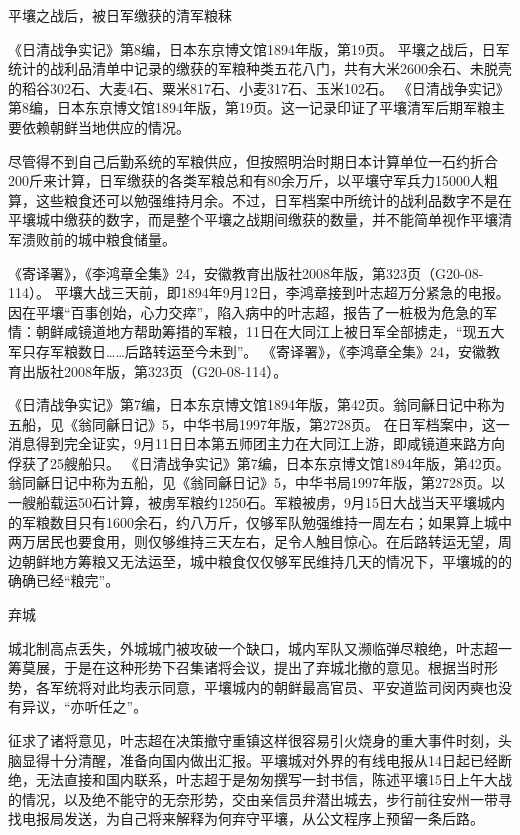 \documentclass[12pt,UTF8]{ctexbook}
\begin{document}
平壤之战后，被日军缴获的清军粮秣

《日清战争实记》第8编，日本东京博文馆1894年版，第19页。
平壤之战后，日军统计的战利品清单中记录的缴获的军粮种类五花八门，共有大米2600余石、未脱壳的稻谷302石、大麦4石、粟米817石、小麦317石、玉米102石。 《日清战争实记》第8编，日本东京博文馆1894年版，第19页。这一记录印证了平壤清军后期军粮主要依赖朝鲜当地供应的情况。

尽管得不到自己后勤系统的军粮供应，但按照明治时期日本计算单位一石约折合200斤来计算，日军缴获的各类军粮总和有80余万斤，以平壤守军兵力15000人粗算，这些粮食还可以勉强维持月余。不过，日军档案中所统计的战利品数字不是在平壤城中缴获的数字，而是整个平壤之战期间缴获的数量，并不能简单视作平壤清军溃败前的城中粮食储量。

《寄译署》，《李鸿章全集》24，安徽教育出版社2008年版，第323页（G20-08-114）。
平壤大战三天前，即1894年9月12日，李鸿章接到叶志超万分紧急的电报。因在平壤“百事创始，心力交瘁”，陷入病中的叶志超，报告了一桩极为危急的军情：朝鲜咸镜道地方帮助筹措的军粮，11日在大同江上被日军全部掳走，“现五大军只存军粮数日……后路转运至今未到”。 《寄译署》，《李鸿章全集》24，安徽教育出版社2008年版，第323页（G20-08-114）。

《日清战争实记》第7编，日本东京博文馆1894年版，第42页。翁同龢日记中称为五船，见《翁同龢日记》5，中华书局1997年版，第2728页。
在日军档案中，这一消息得到完全证实，9月11日日本第五师团主力在大同江上游，即咸镜道来路方向俘获了25艘船只。 《日清战争实记》第7编，日本东京博文馆1894年版，第42页。翁同龢日记中称为五船，见《翁同龢日记》5，中华书局1997年版，第2728页。以一艘船载运50石计算，被虏军粮约1250石。军粮被虏，9月15日大战当天平壤城内的军粮数目只有1600余石，约八万斤，仅够军队勉强维持一周左右；如果算上城中两万居民也要食用，则仅够维持三天左右，足令人触目惊心。在后路转运无望，周边朝鲜地方筹粮又无法运至，城中粮食仅仅够军民维持几天的情况下，平壤城的的确确已经“粮完”。

弃城

城北制高点丢失，外城城门被攻破一个缺口，城内军队又濒临弹尽粮绝，叶志超一筹莫展，于是在这种形势下召集诸将会议，提出了弃城北撤的意见。根据当时形势，各军统将对此均表示同意，平壤城内的朝鲜最高官员、平安道监司闵丙奭也没有异议，“亦听任之”。

征求了诸将意见，叶志超在决策撤守重镇这样很容易引火烧身的重大事件时刻，头脑显得十分清醒，准备向国内做出汇报。平壤城对外界的有线电报从14日起已经断绝，无法直接和国内联系，叶志超于是匆匆撰写一封书信，陈述平壤15日上午大战的情况，以及绝不能守的无奈形势，交由亲信员弁潜出城去，步行前往安州一带寻找电报局发送，为自己将来解释为何弃守平壤，从公文程序上预留一条后路。
\end{document}
